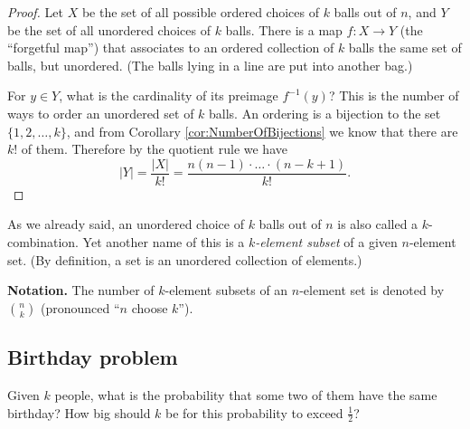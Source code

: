 \begin{page}
\setcounter{section}{2}
\setcounter{subsection}{5}
\setcounter{dfn}{11}
\label{portion:67}

\begin{proof}
Let $X$ be the set of all possible ordered choices of $k$ balls out of $n$,
and $Y$ be the set of all unordered choices of $k$ balls.
There is a map $f \colon X \to Y$ (the ``forgetful map'') that associates to
an ordered collection of $k$ balls the same set of balls, but unordered.
(The balls lying in a line are put into another bag.)

For $y \in Y$, what is the cardinality of its preimage $f^{-1}(y)$?
This is the number of ways to order an unordered set of $k$ balls.
An ordering is a bijection to the set $\{1, 2, \ldots, k\}$, and from Corollary \ref{cor:NumberOfBijections} we know that there are $k!$ of them.
Therefore by the quotient rule we have
\[
|Y| = \frac{|X|}{k!} = \frac{n(n-1)\cdot \ldots \cdot (n-k+1)}{k!}.
\]
\end{proof}

As we already said, an unordered choice of $k$ balls out of $n$ is also called a $k$-combination.
Yet another name of this is a \emph{$k$-element subset} of a given $n$-element set.
(By definition, a set is an unordered collection of elements.)

\smallskip

\noindent\textbf{Notation.}
The number of $k$-element subsets of an $n$-element set is denoted by $\binom{n}{k}$
(pronounced ``$n$ choose $k$'').




\end{page}

\begin{page}
\setcounter{section}{3}
\setcounter{subsection}{0}
\setcounter{dfn}{11}
\label{portion:69}

\subsection{Birthday problem}
Given $k$ people, what is the probability that some two of them have the same birthday?
How big should $k$ be for this probability to exceed $\frac12$?











\end{page}

